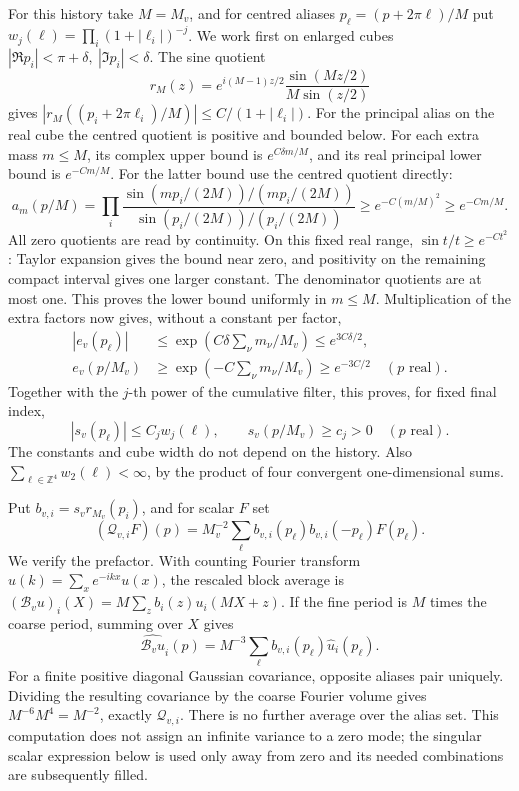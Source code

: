 \documentclass[11pt,reqno]{amsart}
\numberwithin{equation}{section}
\theoremstyle{definition}
\theoremstyle{remark}
\newcommand{\Z}{\mathbb Z}
\begin{document}
For this history take \(M=M_v\), and for centred aliases
\(p_\ell=(p+2\pi\ell)/M\) put
\(w_j(\ell)=\prod_i(1+|\ell_i|)^{-j}\).
We work first on enlarged cubes
\(|\Re p_i|<\pi+\delta,\ |\Im p_i|<\delta\).
The sine quotient
\[
 r_M(z)=e^{i(M-1)z/2}\frac{\sin(Mz/2)}{M\sin(z/2)}
\]
gives \(|r_M((p_i+2\pi\ell_i)/M)|\le C/(1+|\ell_i|)\).
For the principal alias on the real cube the centred quotient
is positive and bounded below. For each extra mass \(m\le M\),
its complex upper bound is \(e^{C\delta m/M}\), and its real
principal lower bound is \(e^{-Cm/M}\). For the latter bound use the centred quotient directly:
\[
 a_m(p/M)=\prod_i
 \frac{\sin(mp_i/(2M))/(mp_i/(2M))}
      {\sin(p_i/(2M))/(p_i/(2M))}
       \ge e^{-C(m/M)^2}\ge e^{-Cm/M}.
\]
All zero quotients are read by continuity. On this fixed real
range, \(\sin t/t\ge e^{-Ct^2}\): Taylor expansion gives the
bound near zero, and positivity on the remaining compact interval
gives one larger constant. The denominator quotients are at most
one. This proves the lower bound uniformly in \(m\le M\). Multiplication of the extra
factors now gives, without a constant per factor,
\[
\begin{aligned}
 |e_v(p_\ell)|&\le\exp\!\left(C\delta\sum_\nu m_\nu/M_v\right)
                  \le e^{3C\delta/2},\\
 e_v(p/M_v)&\ge\exp\!\left(-C\sum_\nu m_\nu/M_v\right)
                  \ge e^{-3C/2}\quad(p\text{ real}).
\end{aligned}
\]
Together with the \(j\)-th power of the cumulative filter,
this proves, for fixed final index,
\begin{equation}
 |s_v(p_\ell)|\le C_jw_j(\ell),\qquad
 s_v(p/M_v)\ge c_j>0\quad(p\text{ real}).
 \label{eq:calibration-history-filter-bound}
\end{equation}
The constants and cube width do not depend on the history.
Also \(\sum_{\ell\in\Z^4}w_2(\ell)<\infty\), by the product
of four convergent one-dimensional sums.

Put \(b_{v,i}=s_vr_{M_v}(p_i)\), and for scalar \(F\) set
\[
 (\mathcal Q_{v,i}F)(p)=M_v^{-2}\sum_\ell
                  b_{v,i}(p_\ell)b_{v,i}(-p_\ell)F(p_\ell).
\]
We verify the prefactor. With counting Fourier transform
\(\widehat u(k)=\sum_x e^{-ikx}u(x)\), the rescaled block
average is \((\mathcal B_vu)_i(X)=M\sum_z b_i(z)u_i(MX+z)\).
If the fine period is \(M\) times the coarse period, summing
over \(X\) gives
\[
 \widehat{\mathcal B_vu}_i(p)=M^{-3}\sum_\ell
                                      b_{v,i}(p_\ell)\widehat u_i(p_\ell).
\]
For a finite positive diagonal Gaussian covariance, opposite
aliases pair uniquely. Dividing the resulting covariance by
the coarse Fourier volume gives
\(M^{-6}M^4=M^{-2}\), exactly \(\mathcal Q_{v,i}\).
There is no further average over the alias set.
This computation does not assign an infinite variance to a zero
mode; the singular scalar expression below is used only away
from zero and its needed combinations are subsequently filled.
\end{document}
